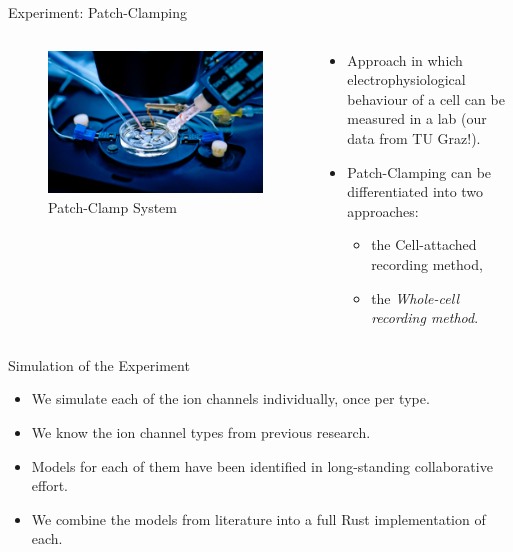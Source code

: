 \documentclass[aspectratio=169, hyperref={colorlinks=true}]{beamer}
\begin{document}
  \begin{frame}{Experiment: Patch-Clamping}
    \begin{columns}
      \begin{column}{0.4\textwidth}
        \begin{figure}
          \includegraphics[width=\textwidth]{../../figures/patch-clamp-system.jpeg}
          \caption{Patch-Clamp System \cite{2025-patch-clamp-image}}
        \end{figure}
      \end{column}
      \begin{column}{0.58\textwidth}
        \begin{itemize}
          \item Approach in which electrophysiological behaviour of a cell can be measured in a lab (our data from TU Graz!).
          \item Patch-Clamping can be differentiated into two approaches:
                \begin{itemize}
                  \item the Cell-attached recording method,
                  \item the \emph{Whole-cell recording method}.
                \end{itemize}
        \end{itemize}
      \end{column}
    \end{columns}
  \end{frame}

  \begin{frame}{Simulation of the Experiment}
    \begin{itemize}
      \item We simulate each of the ion channels individually, once per type.
      \item We know the ion channel types from previous research.
      \item Models for each of them have been identified in long-standing collaborative effort.
      \item We combine the models from literature into a full Rust implementation of each.
    \end{itemize}
  \end{frame}
\end{document}
